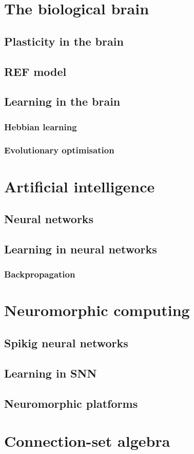 \documentclass[report.tex]{subfiles}
\begin{document}
\section{The biological brain}
\subsection{Plasticity in the brain}
\subsection{REF model} \label{sec:ref}

\subsection{Learning in the brain}
\subsubsection{Hebbian learning}
\subsubsection{Evolutionary optimisation}

\section{Artificial intelligence}
\subsection{Neural networks} \label{sec:NN}
\subsection{Learning in neural networks}
\subsubsection{Backpropagation}

\section{Neuromorphic computing}
\subsection{Spikig neural networks} \label{sec:SNN}
\subsection{Learning in SNN}
\subsection{Neuromorphic platforms}

\section{Connection-set algebra} \label{sec:CSA}
\end{document}
